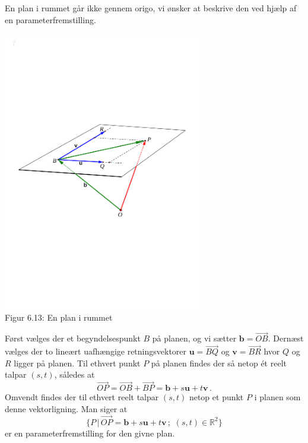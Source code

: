 \begin{example}\label{tn6.planRum2}
En plan i rummet går ikke gennem origo, vi ønsker at beskrive den ved hjælp af en para\-meterfremstilling.
\begin{center}
		\includegraphics[trim=1.5cm 9cm 1.5cm
 9cm,width=0.65\textwidth,clip]{geometer/vektor15.pdf}	
   \\Figur 6.13: En plan i rummet	
\end{center}
Først vælges der et begyndelsespunkt $B$ på planen, og vi sætter $\mathbf b=\stackrel{\rightarrow}{OB}$. Dernæst vælges der to lineært uafhængige retningsvektorer $\mathbf u=\stackrel{\rightarrow}{BQ}$ og $\mathbf v=\stackrel{\rightarrow}{BR}$ hvor $Q$ og $R$ ligger på planen. Til ethvert punkt $P$ på planen findes der så netop ét reelt talpar $(s,t)$, således at  
$$\stackrel{\rightarrow}{OP}=\stackrel{\rightarrow}{OB}+\stackrel{\rightarrow}{BP}=\mathbf b+s\mathbf u+t\mathbf v\,.$$
Omvendt findes der til ethvert reelt talpar $(s,t)$ netop et punkt $P$ i planen som denne vektorligning. Man siger at
$$
\{P\,|\, \stackrel{\rightarrow}{OP}=\mathbf b+s\mathbf u+t\mathbf v\,;\,\,(s,t)\in \mathbb R^2\}
$$
er en parameterfremstilling for den givne plan.
\end{example}
